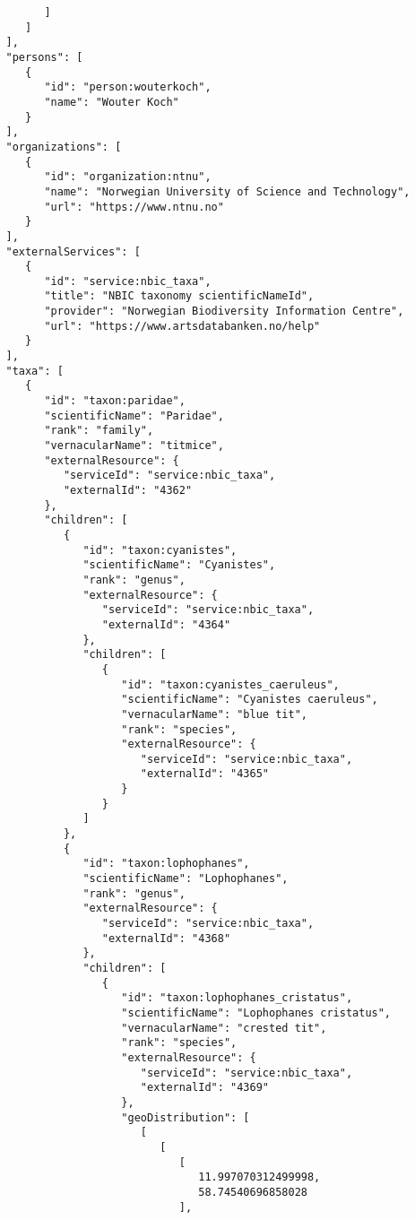 \documentclass[10pt,letterpaper]{article}
\begin{document}
\begin{verbatim}
         ]
      ]
   ],
   "persons": [
      {
         "id": "person:wouterkoch",
         "name": "Wouter Koch"
      }
   ],
   "organizations": [
      {
         "id": "organization:ntnu",
         "name": "Norwegian University of Science and Technology",
         "url": "https://www.ntnu.no"
      }
   ],
   "externalServices": [
      {
         "id": "service:nbic_taxa",
         "title": "NBIC taxonomy scientificNameId",
         "provider": "Norwegian Biodiversity Information Centre",
         "url": "https://www.artsdatabanken.no/help"
      }
   ],
   "taxa": [
      {
         "id": "taxon:paridae",
         "scientificName": "Paridae",
         "rank": "family",
         "vernacularName": "titmice",
         "externalResource": {
            "serviceId": "service:nbic_taxa",
            "externalId": "4362"
         },
         "children": [
            {
               "id": "taxon:cyanistes",
               "scientificName": "Cyanistes",
               "rank": "genus",
               "externalResource": {
                  "serviceId": "service:nbic_taxa",
                  "externalId": "4364"
               },
               "children": [
                  {
                     "id": "taxon:cyanistes_caeruleus",
                     "scientificName": "Cyanistes caeruleus",
                     "vernacularName": "blue tit",
                     "rank": "species",
                     "externalResource": {
                        "serviceId": "service:nbic_taxa",
                        "externalId": "4365"
                     }
                  }
               ]
            },
            {
               "id": "taxon:lophophanes",
               "scientificName": "Lophophanes",
               "rank": "genus",
               "externalResource": {
                  "serviceId": "service:nbic_taxa",
                  "externalId": "4368"
               },
               "children": [
                  {
                     "id": "taxon:lophophanes_cristatus",
                     "scientificName": "Lophophanes cristatus",
                     "vernacularName": "crested tit",
                     "rank": "species",
                     "externalResource": {
                        "serviceId": "service:nbic_taxa",
                        "externalId": "4369"
                     },
                     "geoDistribution": [
                        [
                           [
                              [
                                 11.997070312499998,
                                 58.74540696858028
                              ],

\end{verbatim}
\end{document}
